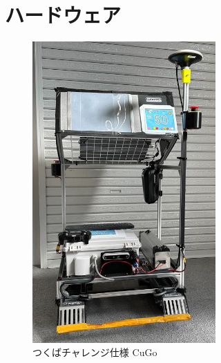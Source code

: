 \documentclass[platex,dvipdfmx]{rbproceedings}
\begin{document}
\section{ハードウェア}

\begin{figure}[htbp]
    \centering
    \includegraphics[keepaspectratio,width=70mm]{fig/cugo_tsukuba.png}
    \caption{つくばチャレンジ仕様 CuGo}
    \label{fig:cugo_ros_tsukuba}
\end{figure}
\end{document}
